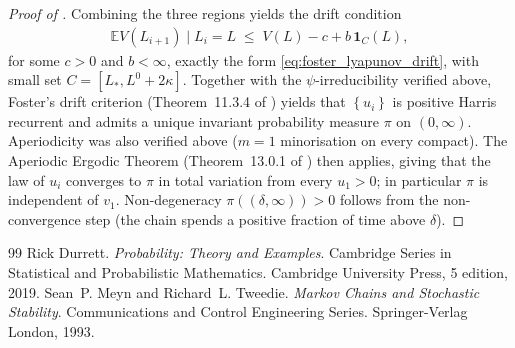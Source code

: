 \documentclass[10pt,a4paper]{amsart}
\newcommand{\Exp}[1]{\mathbb{E} #1}
\newcommand{\Set}[1]{\left\{ #1 \right\}}
\newcommand{\cond}{\mid}
\begin{document}
\begin{proof}[Proof of ]
  Combining the three regions yields the drift condition
  \begin{eqnarray*}
    \Exp{V(L_{i+1}) \cond L_i = L} \;\le\; V(L) - c + b\,\mathbf{1}_C(L),
  \end{eqnarray*}
  for some $c > 0$ and $b < \infty$, exactly the form \eqref{eq:foster_lyapunov_drift}, with small set $C = [L_*, L^0 + 2\kappa]$. Together with the $\psi$-irreducibility verified above, Foster's drift criterion (Theorem~11.3.4 of \cite{meyn1993markov}) yields that $\Set{u_i}$ is positive Harris recurrent and admits a unique invariant probability measure $\pi$ on $(0, \infty)$. Aperiodicity was also verified above ($m = 1$ minorisation on every compact). The Aperiodic Ergodic Theorem (Theorem~13.0.1 of \cite{meyn1993markov}) then applies, giving that the law of $u_i$ converges to $\pi$ in total variation from every $u_1 > 0$; in particular $\pi$ is independent of $v_1$. Non-degeneracy $\pi((\delta,\infty)) > 0$ follows from the non-convergence step (the chain spends a positive fraction of time above $\delta$).
\end{proof}

\begin{thebibliography}{99}
 Rick Durrett. \newblock \emph{Probability: Theory and Examples}. \newblock Cambridge Series in Statistical and Probabilistic Mathematics. Cambridge University Press, 5 edition, 2019.
 Sean~P. Meyn and Richard~L. Tweedie. \newblock \emph{Markov Chains and Stochastic Stability}. \newblock Communications and Control Engineering Series. Springer-Verlag London, 1993.
\end{thebibliography}
\end{document}
